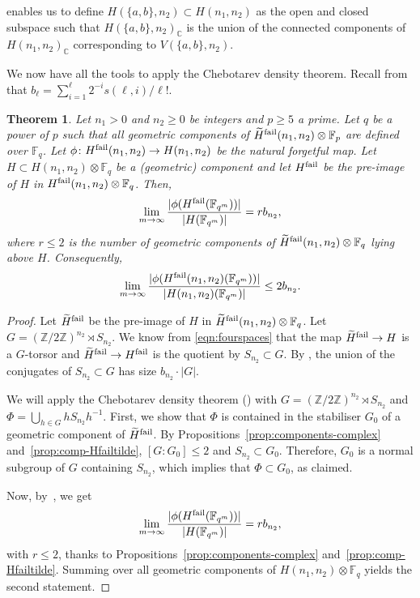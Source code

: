 \documentclass{amsart}
\numberwithin{equation}{section} \numberwithin{figure}{section}
\newcommand\FF{\mathbb{F}}
\newcommand\ZZ{\mathbb{Z}}
\newcommand\CC{\mathbb{C}}
\theoremstyle{one}
\newtheorem{theorem}{\textbf{Theorem}}[section]
\theoremstyle{definition}
\begin{document}
 enables us to define \(H(\{a,b\}, n_2) \subset H(n_1,n_2)\) as the open and closed subspace such that \(H(\{a,b\},n_2)_{\CC}\) is the union of the connected components of \(H(n_1,n_2)_{\CC}\) corresponding to \(V(\{a,b\}, n_2)\). 

We now have all the tools to apply the Chebotarev density theorem.
Recall from  that \(b_\ell = \sum_{i=1}^\ell2^{-i}s(\ell,i)/\ell!\).
\begin{theorem}\label{thm:failbound}
  Let \(n_1 > 0\) and \(n_{2} \geq 0\) be integers and \(p \geq 5\) a prime.
  Let \(q\) be a power of \(p\) such that all geometric components of \(\widetilde H^{\rm fail}(n_1,n_2) \otimes \FF_p\) are defined over \(\FF_q\).
  Let \(\phi \colon  H^{\rm fail}(n_1,n_2) \to H(n_{1},n_2)\) be the natural forgetful map. 
Let \(H \subset H(n_1,n_2) \otimes \FF_q\) be a (geometric) component and let \(H^{\rm fail}\) be the pre-image of \(H\) in \(H^{\rm fail}(n_1,n_2) \otimes \FF_q\).
  Then,
   \[ \lim_{m \to \infty} \frac{|\phi(H^{\rm fail}(\FF_{q^m}))|}{|H(\FF_{q^m})|} = rb_{n_2},\]
  where $r\leq 2$ is the number of geometric components of \(\widetilde H^{\rm fail}(n_1,n_2) \otimes \FF_q\) lying above $H$. Consequently,
   \[ \lim_{m \to \infty} \frac{|\phi(H^{\rm fail}(n_1,n_2)(\FF_{q^m}))|}{|H(n_1,n_2)(\FF_{q^m})|} \leq 2 b_{n_2}.\]
  
\end{theorem}
\begin{proof}
  Let 
  \(\widetilde H^{\rm fail}\) be the pre-image of \(H\) in 
  \(\widetilde H^{\rm fail}(n_1,n_2) \otimes \FF_q\). 
   Let \(G = (\ZZ/2\ZZ)^{n_2} \rtimes S_{n_2}\).
  We know from \eqref{eqn:fourspaces} that the map \(\widetilde H^{\rm fail} \to H\) is a \(G\)-torsor and \(\widetilde H^{\rm fail} \to H^{\rm fail}\) is the quotient by \(S_{n_2} \subset G\). 
  By , the union of the conjugates of \(S_{n_2} \subset G\) has size \(b_{n_2} \cdot |G|\).
  
We will apply the Chebotarev density theorem () with $G=(\ZZ/2\ZZ)^{n_2}\rtimes S_{n_2}$ and \(\Phi = \bigcup_{h \in G} h S_{n_2} h^{-1}\). First, we show that $\Phi$ is contained in the stabiliser $G_0$ of a geometric component of $\widetilde H^{\rm fail}$. By Propositions~\ref{prop:components-complex} and~\ref{prop:comp-Hfailtilde}, $[G:G_0]\leq 2$ and $S_{n_2}\subset G_0$. Therefore, $G_0$ is a normal subgroup of $G$ containing $S_{n_2}$, which implies that $\Phi\subset G_0$, as claimed.
  

 Now, by~, we get
  \[ \lim_{m \to \infty} \frac{|\phi(H^{\rm fail}(\FF_{q^m}))|}{|H(\FF_{q^m})|} = rb_{n_2},\]
  with $r\leq 2$, thanks to Propositions~\ref{prop:components-complex} and~\ref{prop:comp-Hfailtilde}.
  Summing over all geometric components 
 of \(H(n_1,n_2) \otimes \FF_q\) yields the second statement. 
\end{proof}
\end{document}
